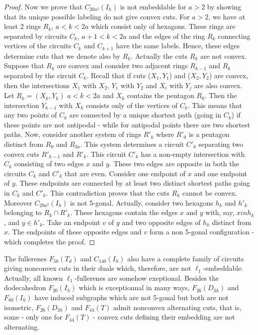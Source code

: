 \begin{proposition}
\begin{proof}
Now we prove that $C_{20a^2}(I_h)$ is not embeddable for $a>2$ by showing 
that its unique possible labeling do not give convex cuts. For $a>2$, we have at least 
2 rings $R_k$, $a<k<2a$ which consist only of hexagons.
These rings are separated by circuits $C_k$, $a+1<k<2a$ and the edges of the ring
$R_k$ connecting vertices of the circuits $C_k$ and $C_{k+1}$ have the
same labels. Hence, these edges determine cuts that we denote also by $R_k$.
Actually the cuts $R_k$ are not convex. Suppose that $R_k$ are convex and
consider two adjacent rings $R_{k-1}$ and $R_k$ separated by the circuit 
$C_k$. Recall that if cuts ($X_1,Y_1$) and ($X_2,Y_2$) are convex, then the
intersections $X_1$ with $X_2$, $Y_1$ with $Y_2$ and $X_i$ with $Y_j$ are
also convex.
Let $R_k=(X_k,Y_k)$ $a<k<2a$ and $X_k$ contains the pentagon $R_0$.
Then the intersection $Y_{k-1}$ with $X_k$ consists only of the vertices of $C_k$.
This means that any two points of $C_k$ are connected by a unique shortest
path (going in $C_k$) if these points are not antipodal - while for antipodal
points there are two shortest paths.
Now, consider another system of rings $R'_k$ where $R'_0$ is a pentagon
distinct from $R_0$ and $R_{3a}$. This system determines a circuit $C'_k$
separating two convex cuts $R'_{k-1}$ and $R'_k$. This circuit $C'_k$ has a
non-empty intersection with $C_k$ consisting of two edges $x$ and $y$.
These two edges are opposite in both the circuits $C_k$ and $C'_k$ that are
even. Consider one endpoint of $x$ and one endpoint of $y$. These endpoints
are connected by at least two distinct shortest paths going in $C_k$ and
$C'_k$. This contradiction proves that the cuts $R_k$ cannot be convex.
Moreover $C_{20a^2}(I_h)$ is not 5-gonal. Actually, consider two hexagons 
$h_k$ and $h'_k$ belonging to $R_k\cap R'_k$. 
These hexagons contain the edges $x$ and $y$ with, say, $x in h_k$, and
$y\in h'_k$. Take an endpoint $v$ of $y$ and two opposite edges of $h_k$
distinct from $x$. The endpoints of these opposite edges and $v$ form
a non 5-gonal configuration
- which completes the proof. 

\end{proof}
\end{proposition}

\begin{remark}
The fullerenes $F_{56}(T_d)$ and $C_{140}(I_h)$ also have a complete family
of circuits giving nonconvex cuts in their duals which, therefore,
are not $\ell_1$-embeddable.
Actually, all known $\ell_1$-fullerenes are somehow exeptional.
Besides the dodecahedron $F_{20}(I_h)$ which is exceptionnal in many ways, 
$F_{26}(D_{3h})$ and $F_{80}(I_h)$ have induced subgraphs which are 
not 5-gonal but both are not isometric, $F_{26}(D_{3h})$ and $F_{44}(T)$ 
admit nonconvex 
alternating cuts, that is, some - only one for $F_{44}(T)$ - convex cuts 
defining their embedding are not alternating.
\end{remark}

